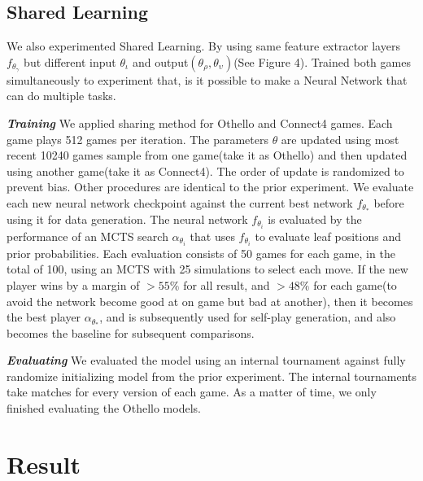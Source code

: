\documentclass[12pt,a4paper]{report}
\begin{document}
\section{Shared Learning}
\hspace{0.6cm} We also experimented Shared Learning. By using same feature extractor layers \(f_{\theta_\gamma}\) but different input \(\theta_\iota\) and output\((\theta_\rho, \theta_\upsilon)\)(See Figure 4). Trained both games simultaneously to experiment that, is it possible to make a Neural Network that can do multiple tasks.\par
\textit{\textbf{Training}} We applied sharing method for Othello and Connect4 games. Each game plays 512 games per iteration. The parameters \(\theta\) are updated using most recent 10240 games sample from one game(take it as Othello) and then updated using another game(take it as Connect4). The order of update is randomized to prevent bias. Other procedures are identical to the prior experiment. We evaluate each new neural network checkpoint against the current best network \(f_{\theta_\ast}\) before using it for data generation. The neural network \(f_{\theta_i}\) is evaluated by the performance of an MCTS search \(\alpha_{\theta_i}\) that uses \(f_{\theta_i}\) to evaluate leaf positions and prior probabilities. Each evaluation consists of 50 games for each game, in the total of 100, using an MCTS with 25 simulations to select each move. If the new player wins by a margin of \(> 55\%\) for all result, and \(> 48\%\) for each game(to avoid the network become good at on game but bad at another), then it becomes the best player \(\alpha_{\theta_\ast}\), and is subsequently used for self-play generation, and also becomes the baseline for subsequent comparisons.\par
\textit{\textbf{Evaluating}} We evaluated the model using an internal tournament against fully randomize initializing model from the prior experiment. The internal tournaments take matches for every version of each game. As a matter of time, we only finished evaluating the Othello models.

\clearpage
\chapter{Result}\thispagestyle{fancy}
\end{document}
